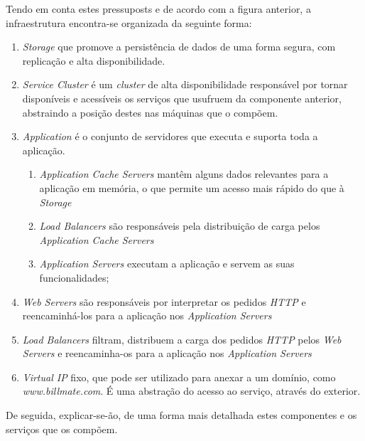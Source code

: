 Tendo em conta estes pressuposts e de acordo com a figura anterior, a infraestrutura encontra-se organizada da seguinte forma:

\begin{enumerate}
	\item \emph{Storage} que promove a persistência de dados de uma forma segura, com replicação e alta disponibilidade.
	\item \emph{Service Cluster} é um \emph{cluster} de alta disponibilidade responsável por tornar disponíveis e acessíveis os serviços que usufruem da componente anterior, abstraindo a posição destes nas máquinas que o compõem.
	\item \emph{Application} é o conjunto de servidores que executa e suporta toda a aplicação.
	\begin{enumerate}
		\item \emph{Application Cache Servers} mantêm alguns dados relevantes para a aplicação em memória, o que permite um acesso mais rápido do que à \emph{Storage}
		\item \emph{Load Balancers} são responsáveis pela distribuição de carga pelos \emph{Application Cache Servers}
		\item \emph{Application Servers} executam a aplicação e servem as suas funcionalidades;
	\end{enumerate}
	\item \emph{Web Servers} são responsáveis por interpretar os pedidos \emph{HTTP} e reencaminhá-los para a aplicação nos \emph{Application Servers}
	\item \emph{Load Balancers} filtram, distribuem a carga dos pedidos \emph{HTTP} pelos \emph{Web Servers} e reencaminha-os para a aplicação nos \emph{Application Servers}
	\item \emph{Virtual IP} fixo, que pode ser utilizado para anexar a um domínio, como \emph{www.billmate.com}. É uma abstração do acesso ao serviço, através do exterior.
\end{enumerate}

De seguida, explicar-se-ão, de uma forma mais detalhada estes componentes e os serviços que os compõem.
